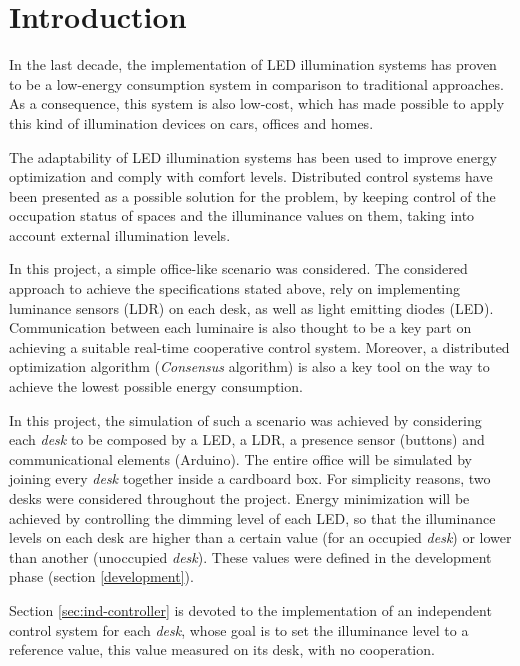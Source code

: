 \documentclass[english,fira]{ist-report}
\begin{document}
\setcounter{tocdepth}{2}
{\hypersetup{linkcolor = black} \tableofcontents}

\pagebreak
\section{Introduction}

In the last decade, the implementation of LED illumination systems has proven to be a low-energy consumption system in comparison to traditional approaches. As a consequence, this system is also low-cost, which has made possible to apply this kind of illumination devices on cars, offices and homes.

The adaptability of LED illumination systems has been used to improve energy optimization and comply with comfort levels. Distributed control systems have been presented as a possible solution for the problem, by keeping control of the occupation status of spaces and the illuminance values on them, taking into account external illumination levels.

In this project, a simple office-like scenario was considered. The considered approach to achieve the specifications stated above, rely on implementing luminance sensors (LDR) on each desk, as well as light emitting diodes (LED). Communication between each luminaire is also thought to be a key part on achieving a suitable real-time cooperative control system. Moreover, a distributed optimization algorithm (\textit{Consensus} algorithm) is also a key tool on the way to achieve the lowest possible energy consumption.

In this project, the simulation of such a scenario was achieved by considering each \textit{desk} to be composed by a LED, a LDR, a presence sensor (buttons) and communicational elements (Arduino). The entire office will be simulated by joining every \textit{desk} together inside a cardboard box. For simplicity reasons, two desks were considered throughout the project. Energy minimization will be achieved by controlling the dimming level of each LED, so that the illuminance levels on each desk are higher than a certain value (for an occupied \textit{desk}) or lower than another (unoccupied \textit{desk}). These values were defined in the development phase (section \ref{development}). 

Section \ref{sec:ind-controller} is devoted to the implementation of an independent control system for each \textit{desk}, whose goal is to set the illuminance level to a reference value, this value measured on its desk, with no cooperation.
\end{document}
